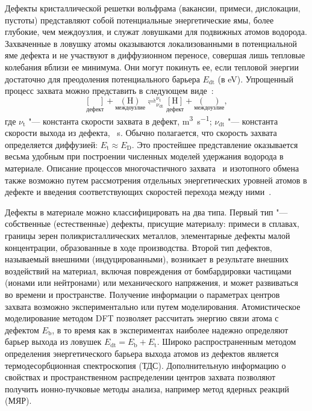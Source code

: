Дефекты кристаллической решетки вольфрама (вакансии, примеси, дислокации, пустоты) представляют собой потенциальные энергетические ямы, более глубокие, чем междоузлия, и служат ловушками для подвижных атомов водорода. Захваченные в ловушку атомы оказываются локализованными в потенциальной яме дефекта и не участвуют в диффузионном переносе, совершая лишь тепловые колебания вблизи ее минимума. Они могут покинуть ее, если тепловой энергии достаточно для преодоления потенциального барьера $E_\mathrm{dt}$ (в \si{\electronvolt}). Упрощенный процесс захвата можно представить в следующем виде~\cite{Drexler2020}:
\begin{equation*}
    \underset{\text{дефект}}{[\quad]} + \underset{\text{междоузлие}}{(\mathrm{H})} \mathop{\rightleftharpoons}^{\nu_\mathrm{t}}_{\nu_\mathrm{dt}}  \underset{\text{дефект}}{[\mathrm{H}]} +  \underset{\text{междоузлие}}{(\quad)},
\end{equation*}
где \( \nu_\mathrm{t} \) "--- константа скорости захвата в дефект, \si{\metre\cubed\per\second}; \( \nu_\mathrm{dt}\) "--- константа скорости выхода из дефекта, \si{\per\second}. Обычно полагается, что скорость захвата определяется диффузией: \( E_\mathrm{t} \approx E_\mathrm{D} \). Это простейшее представление оказывается весьма удобным при построении численных моделей удержания водорода в материале. Описание процессов многочастичного захвата~\cite{Johnson2010,Fernandez2015} и изотопного обмена также возможно путем рассмотрения отдельных энергетических уровней атомов в дефекте и введения соответствующих скоростей перехода между ними~\cite{Schmid2014}.

Дефекты в материале можно классифицировать на два типа. Первый тип "--- собственные (естественные) дефекты, присущие материалу: примеси в сплавах, границы зерен поликристаллических металлов, элементарные дефекты малой концентрации, образованные в ходе производства. Второй тип дефектов, называемый внешними (индуцированными), возникает в результате внешних воздействий на материал, включая повреждения от бомбардировки частицами (ионами или нейтронами) или механического напряжения, и может развиваться во времени и пространстве. Получение информации о параметрах центров захвата возможно экспериментально или путем моделирования. Атомистическое моделирование методом DFT позволяет рассчитать энергию связи атома с дефектом \( E_\mathrm{b} \), в то время как в экспериментах наиболее надежно определяют барьер выхода из ловушек \( E_\mathrm{dt}=E_\mathrm{b} + E_\mathrm{t} \). Широко распространенным методом определения энергетического барьера выхода атомов из дефектов является термодесорбционная спектроскопия (ТДС). Дополнительную информацию о свойствах и пространственном распределении центров захвата позволяют получить ионно-пучковые методы анализа, например метод ядерных реакций (МЯР).

